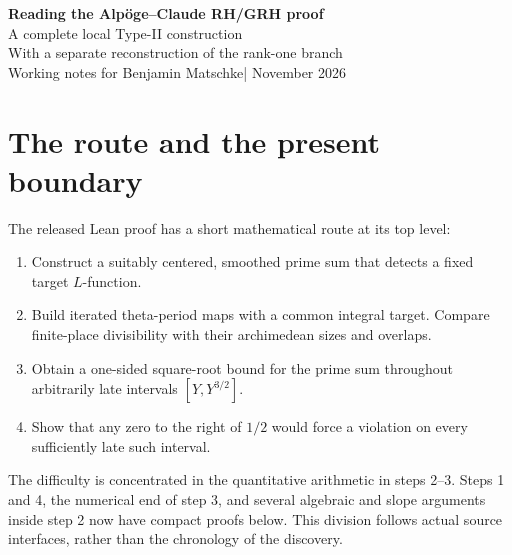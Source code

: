 \documentclass[11pt,a4paper]{article}
\numberwithin{equation}{section}
\theoremstyle{remark}\newtheorem{remark}[theorem]{Remark}
\begin{document}
\begin{center}
{\LARGE\bfseries Reading the Alp\"oge--Claude RH/GRH proof}\\[7pt]
{\large A complete local Type-II construction}\\[-1pt]
{\large With a separate reconstruction of the rank-one branch}\\[8pt]
Working notes for Benjamin Matschke\quad | November 2026
\end{center}

\begingroup\setlength{\fboxsep}{9pt}
\noindent{}\endgroup

\section{The route and the present boundary}

The released Lean proof has a short mathematical route at its top level:
\begin{enumerate}
\item Construct a suitably centered, smoothed prime sum that detects a fixed target $L$-function.
\item Build iterated theta-period maps with a common integral target. Compare finite-place divisibility with their archimedean sizes and overlaps.
\item Obtain a one-sided square-root bound for the prime sum throughout arbitrarily late intervals $[Y,Y^{3/2}]$.
\item Show that any zero to the right of $1/2$ would force a violation on every sufficiently late such interval.
\end{enumerate}
The difficulty is concentrated in the quantitative arithmetic in steps 2--3. Steps 1 and 4, the numerical end of step 3, and several algebraic and slope arguments inside step 2 now have compact proofs below. This division follows actual source interfaces, rather than the chronology of the discovery.
\end{document}
